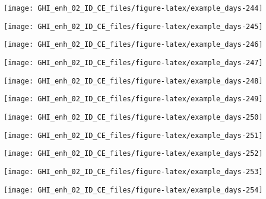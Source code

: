 \documentclass[
  10pt,
  a4paper,oneside]{article}
\begin{document}
\begin{center}\texttt{[image: GHI\_enh\_02\_ID\_CE\_files/figure-latex/example\_days-244]} \end{center}

\begin{center}\texttt{[image: GHI\_enh\_02\_ID\_CE\_files/figure-latex/example\_days-245]} \end{center}

\begin{center}\texttt{[image: GHI\_enh\_02\_ID\_CE\_files/figure-latex/example\_days-246]} \end{center}

\begin{center}\texttt{[image: GHI\_enh\_02\_ID\_CE\_files/figure-latex/example\_days-247]} \end{center}

\begin{center}\texttt{[image: GHI\_enh\_02\_ID\_CE\_files/figure-latex/example\_days-248]} \end{center}

\begin{center}\texttt{[image: GHI\_enh\_02\_ID\_CE\_files/figure-latex/example\_days-249]} \end{center}

\begin{center}\texttt{[image: GHI\_enh\_02\_ID\_CE\_files/figure-latex/example\_days-250]} \end{center}

\begin{center}\texttt{[image: GHI\_enh\_02\_ID\_CE\_files/figure-latex/example\_days-251]} \end{center}

\begin{center}\texttt{[image: GHI\_enh\_02\_ID\_CE\_files/figure-latex/example\_days-252]} \end{center}

\begin{center}\texttt{[image: GHI\_enh\_02\_ID\_CE\_files/figure-latex/example\_days-253]} \end{center}

\begin{center}\texttt{[image: GHI\_enh\_02\_ID\_CE\_files/figure-latex/example\_days-254]} \end{center}
\end{document}
